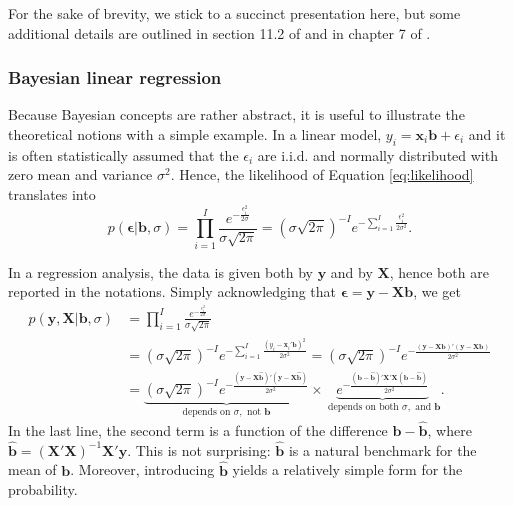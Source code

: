 For the sake of brevity, we stick to a succinct presentation here, but some additional details are outlined in section 11.2 of \cite{gelman2013bayesian} and in chapter 7 of \cite{kruschke2014doing}.

\subsubsection{Bayesian linear regression}

Because Bayesian concepts are rather abstract, it is useful to illustrate the theoretical notions with a simple example. In a linear model, $y_i=\textbf{x}_i\textbf{b}+\epsilon_i$ and it is often statistically assumed that the $\epsilon_i$ are i.i.d. and normally distributed with zero mean and variance $\sigma^2$. Hence, the likelihood of Equation \ref{eq:likelihood} translates into
\begin{equation}
p(\boldsymbol{\epsilon}|\textbf{b}, \sigma)=\prod_{i=1}^I\frac{e^{-\frac{\epsilon_i^2}{2\sigma}}}{\sigma\sqrt{2\pi}}=(\sigma\sqrt{2\pi})^{-I}e^{-\sum_{i=1}^I\frac{\epsilon_i^2}{2\sigma^2}}.
\end{equation}

In a regression analysis, the data is given both by $\textbf{y}$ and by $\textbf{X}$, hence both are reported in the notations. Simply acknowledging that $\boldsymbol{\epsilon}=\textbf{y} -\textbf{Xb}$, we get
\begin{align}
p(\textbf{y},\textbf{X}|\textbf{b}, \sigma)&=\prod_{i=1}^I\frac{e^{-\frac{\epsilon_i^2}{2\sigma}}}{\sigma\sqrt{2\pi}}\\
&=(\sigma\sqrt{2\pi})^{-I}e^{-\sum_{i=1}^I\frac{\left(y_i-\textbf{x}_i'\textbf{b}\right)^2}{2\sigma^2}}=(\sigma\sqrt{2\pi})^{-I} e^{-\frac{\left(\textbf{y}-\textbf{X}\textbf{b}\right)' \left(\textbf{y}-\textbf{X}\textbf{b}\right)}{2\sigma^2}} \\
&=\underbrace{(\sigma\sqrt{2\pi})^{-I} e^{-\frac{\left(\textbf{y}-\textbf{X}\hat{\textbf{b}}\right)' \left(\textbf{y}-\textbf{X}\hat{\textbf{b}}\right)}{2\sigma^2}}}_{\text{depends on } \sigma, \text{ not } \textbf{b}}\times \underbrace{e^{-\frac{(\textbf{b}-\hat{\textbf{b}})'\textbf{X}'\textbf{X}(\textbf{b}-\hat{\textbf{b}})}{2\sigma^2}}}_{\text{ depends on both } \sigma, \text{ and } \textbf{b} }.
\end{align}
In the last line, the second term is a function of the difference $\textbf{b} -\hat{\textbf{b}}$, where $\hat{\textbf{b}}=(\textbf{X}'\textbf{X})^{ -1}\textbf{X}'\textbf{y}$. This is not surprising: $\hat{\textbf{b}}$ is a natural benchmark for the mean of $\textbf{b}$. Moreover, introducing $\hat{\textbf{b}}$ yields a relatively simple form for the probability.

